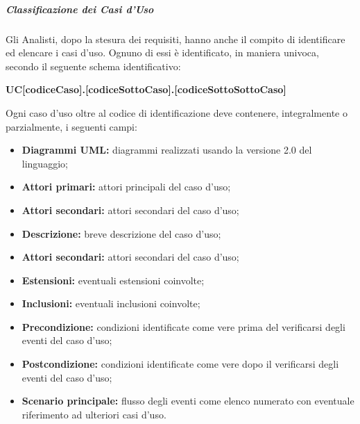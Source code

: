 				\subparagraph{Classificazione dei Casi d'Uso}
					Gli Analisti, dopo la stesura dei requisiti, hanno anche il compito di identificare ed elencare i casi d’uso. Ognuno di essi è identificato, in maniera univoca, secondo il seguente schema identificativo:
					\begin{center}
						\textbf{UC[codiceCaso].[codiceSottoCaso].[codiceSottoSottoCaso]}
					\end{center}
					Ogni caso d'uso oltre al codice di identificazione deve contenere, integralmente o parzialmente, i seguenti campi:
					\begin{itemize}
						\item \textbf{Diagrammi UML:} diagrammi realizzati usando la versione 2.0 del linguaggio;
						\item \textbf{Attori primari:} attori principali del caso d’uso; 
						\item \textbf{Attori secondari:} attori secondari del caso d’uso;
						\item \textbf{Descrizione:} breve descrizione del caso d'uso;
						\item \textbf{Attori secondari:} attori secondari del caso d’uso;
						\item \textbf{Estensioni:} eventuali estensioni coinvolte;
						\item \textbf{Inclusioni:} eventuali inclusioni coinvolte;
						\item \textbf{Precondizione:} condizioni identificate come vere prima del verificarsi degli eventi del caso d’uso;
						\item \textbf{Postcondizione:} condizioni identificate come vere dopo il verificarsi degli eventi del caso d’uso;
						\item \textbf{Scenario principale:} flusso degli eventi come elenco numerato con eventuale riferimento ad ulteriori casi d’uso.
					\end{itemize}
				
